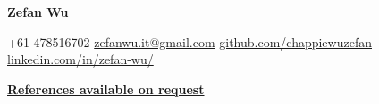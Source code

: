 \documentclass[11pt, a4paper]{russell}
\begin{document}
\begin{center}
{\fontsize{20pt}{1em}\headerfont\color{text}\textbf{Zefan Wu}\par}
\vspace{1.2mm}
{\fontsize{8.8pt}{1em}\bodyfont\color{text}
+61 478516702 \quad\textbar\quad
\href{mailto:zefanwu.it@gmail.com}{zefanwu.it@gmail.com} \quad\textbar\quad
\href{https://github.com/chappiewuzefan}{github.com/chappiewuzefan} \quad\textbar\quad
\href{https://www.linkedin.com/in/zefan-wu/}{linkedin.com/in/zefan-wu/}
\par}
\end{center}







% 
% 
% 
% 
% 

\vspace*{\fill}
\begin{center}
\underline{\textbf{References available on request}}
\end{center}
\end{document}
